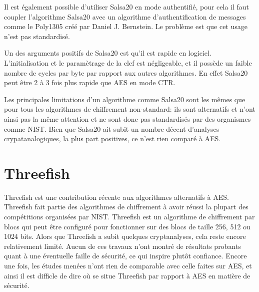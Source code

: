 Il est également possible d'utiliser Salsa20 en mode authentifié, pour cela il faut coupler l'algorithme Salsa20 avec un algorithme d'authentification de messages comme le Poly1305 créé par Daniel J. Bernstein. Le problème est que cet usage n'est pas standardisé.

Un des arguments positifs de Salsa20 est qu'il est rapide en logiciel. L'initialisation et le paramètrage de la clef est négligeable, et il possède un faible nombre de cycles par byte par rapport aux autres algorithmes. En effet Salsa20 peut être 2 à 3 fois plus rapide que AES en mode CTR.

Les principales limitations d'un algorithme comme Salsa20 sont les mêmes que pour tous les algorithmes de chiffrement non-standard: ils sont alternatifs et n'ont ainsi pas la même attention et ne sont donc pas standardisés par des organismes comme NIST. Bien que Salsa20 ait subit un nombre décent d'analyses crypatanalogiques, la plus part positives, ce n'est rien comparé à AES.


\section{Threefish}
Threefish est une contribution récente aux algorithmes alternatifs à AES. Threefish fait partie des algorithmes de chiffrement à avoir réussi la plupart des compétitions organisées par NIST. Threefish est un algorithme de chiffrement par blocs qui peut être configuré pour fonctionner sur des blocs de taille 256, 512 ou 1024 bits. Alors que Threefish a subit quelques cryptanalyses, cela reste encore relativement limité. Aucun de ces travaux n'ont montré de résultats probants quant à une éventuelle faille de sécurité, ce qui inspire plutôt confiance. Encore une fois, les études menées n'ont rien de comparable avec celle faites sur AES, et ainsi il est difficle de dire où se situe Threefish par rapport à AES en matière de sécurité.

